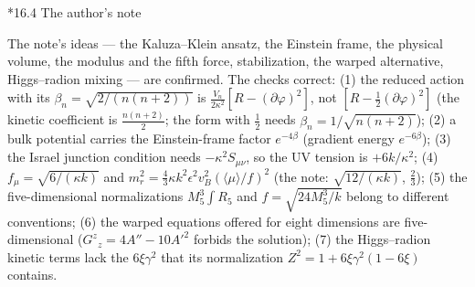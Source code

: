 \documentclass[10pt,a4paper]{article}
\makeatletter
\renewcommand\subsection{\@startsection{subsection}{2}{\z@}{-3.25ex\@plus -1ex \@minus -.2ex}{1.5ex \@plus .2ex}{\normalfont\large\bfseries\raggedright}}
\makeatother
\begin{document}
\subsection*{16.4 The author’s note}
The note’s ideas — the Kaluza–Klein ansatz, the Einstein frame, the physical volume, the modulus and the fifth force, stabilization, the warped alternative, Higgs–radion mixing — are confirmed. The checks correct: (1) the reduced action with its $\beta_n=\sqrt{2/(n(n+2))}$ is $\frac{V_n}{2\kappa^2}[R-(\partial\varphi)^2]$, not $[R-\frac12(\partial\varphi)^2]$ (the kinetic coefficient is $\frac{n(n+2)}2$; the form with $\frac12$ needs $\beta_n=1/\sqrt{n(n+2)}$); (2) a bulk potential carries the Einstein-frame factor $e^{-4\beta}$ (gradient energy $e^{-6\beta}$); (3) the Israel junction condition needs $-\kappa^2S_{\mu\nu}$, so the UV tension is $+6k/\kappa^2$; (4) $f_\mu=\sqrt{6/(\kappa k)}$ and $m_r^2=\frac43\kappa k^2\epsilon^2v_B^2(\langle\mu\rangle/f)^2$ (the note: $\sqrt{12/(\kappa k)}$, $\frac23$); (5) the five-dimensional normalizations $M_5^3\int R_5$ and $f=\sqrt{24M_5^3/k}$ belong to different conventions; (6) the warped equations offered for eight dimensions are five-dimensional ($G^z{}_z=4A''-10A'^2$ forbids the solution); (7) the Higgs–radion kinetic terms lack the $6\xi\gamma^2$ that its normalization $Z^2=1+6\xi\gamma^2(1-6\xi)$ contains.
\end{document}
